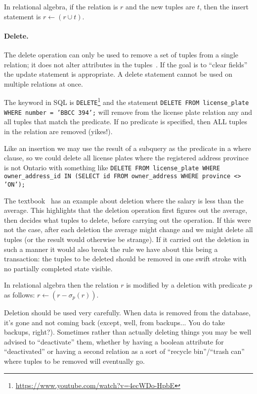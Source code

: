 In relational algebra, if the relation is $r$ and the new tuples are $t$, then the insert statement is $r \leftarrow (r \cup t)$.

\paragraph{Delete.}

The delete operation can only be used to remove a set of tuples from a single relation; it does not alter attributes in the tuples~\cite{dsc}. If the goal is to ``clear fields'' the update statement is appropriate. A delete statement cannot be used on multiple relations at once.

The keyword in SQL is \texttt{DELETE}\footnote{\url{https://www.youtube.com/watch?v=4ecWDo-HpbE}} and the statement \texttt{DELETE FROM license\_plate WHERE number = 'BBCC 394';} will remove from the license plate relation any and all tuples that match the predicate. If no predicate is specified, then ALL tuples in the relation are removed (yikes!).

Like an insertion we may use the result of a subquery as the predicate in a where clause, so we could delete all license plates where the registered address province is not Ontario with something like \texttt{DELETE FROM license\_plate WHERE owner\_address\_id IN (SELECT id FROM owner\_address WHERE province <> 'ON');}

The textbook~\cite{dsc} has an example about deletion where the salary is less than the average. This highlights that the deletion operation first figures out the average, then decides what tuples to delete, before carrying out the operation. If this were not the case, after each deletion the average might change and we might delete all tuples (or the result would otherwise be strange). If it carried out the deletion in such a manner it would also break the rule we have about this being a transaction: the tuples to be deleted should be removed in one swift stroke with no partially completed state visible.

In relational algebra then the relation $r$ is modified by a deletion with predicate $p$ as follows: $r \leftarrow (r - \sigma_{p}( r ) )$.

Deletion should be used very carefully. When data is removed from the database, it's gone and not coming back (except, well, from backups... You do take backups, right?). Sometimes rather than actually deleting things you may be well advised to ``deactivate'' them, whether by having a boolean attribute for ``deactivated'' or having a second relation as a sort of ``recycle bin''/``trash can'' where tuples to be removed will eventually go.

